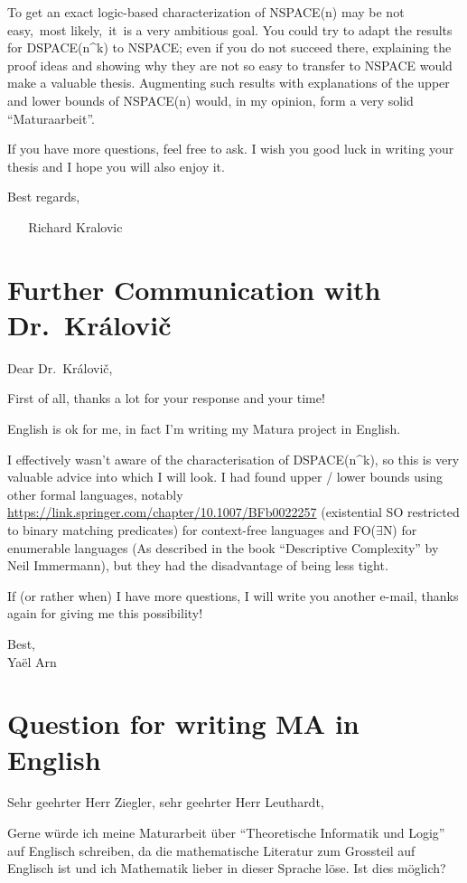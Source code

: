 To get an exact logic-based characterization of NSPACE(n) may be not
easy,~most likely,~it~is a very ambitious goal. You could try to adapt
the results for DSPACE(n\^{}k) to NSPACE; even if you do not succeed
there, explaining the proof ideas and showing why they are not so easy
to transfer to NSPACE would make a valuable thesis. Augmenting such
results with explanations of the upper and lower bounds of NSPACE(n)
would, in my opinion, form a very solid ``Maturaarbeit''.

If you have more questions, feel free to ask. I wish you good luck in
writing your thesis and I hope you will also enjoy it.

Best regards,

~ ~ Richard Kralovic

\section{Further Communication with
Dr.~Královi\v{c}}\label{further-communication-with-dr.-kruxe1loviux10d}

Dear Dr.~Královi\v{c},

First of all, thanks a lot for your response and your time!

English is ok for me, in fact I'm writing my Matura project in English.

I effectively wasn't aware of the characterisation of DSPACE(n\^{}k), so
this is very valuable advice into which I will look. I had found upper /
lower bounds using other formal languages, notably
\url{https://link.springer.com/chapter/10.1007/BFb0022257} (existential
SO restricted to binary matching predicates) for context-free languages
and FO($\exists$N) for enumerable languages (As described in the book
``Descriptive Complexity'' by Neil Immermann), but they had the
disadvantage of being less tight.

If (or rather when) I have more questions, I will write you another
e-mail, thanks again for giving me this possibility!

Best,\\
Yaël Arn

\section{Question for writing MA in
English}\label{question-for-writing-ma-in-english}


Sehr geehrter Herr Ziegler, sehr geehrter Herr Leuthardt,

\sloppy Gerne würde ich meine Maturarbeit über ``Theoretische Informatik und
Logig'' auf Englisch schreiben, da die mathematische Literatur zum
Grossteil auf Englisch ist und ich Mathematik lieber in dieser Sprache
löse. Ist dies möglich?

